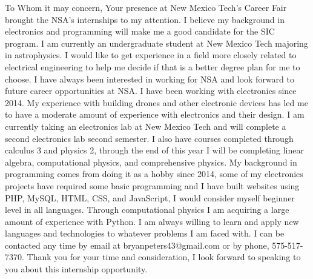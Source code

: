 \begin{flushleft}
\hspace{0pt}
\vfill
    
    To Whom it may concern, 
\break
\newline
    Your presence at New Mexico Tech's Career Fair brought the NSA's internships to my attention. I believe my background in electronics and programming will make me a good candidate for the SIC program. I am currently an undergraduate student at New Mexico Tech majoring in astrophysics. I would like to get experience in a field more closely related to electrical engineering to help me decide if that is a better degree plan for me to choose. I have always been interested in working for NSA and look forward to future career opportunities at NSA. 
\break
\newline
    I have been working with electronics since 2014. My experience with building drones and other electronic devices has led me to have a moderate amount of experience with electronics and their design. I am currently taking an electronics lab at New Mexico Tech and will complete a second electronics lab second semester. I also have courses completed through calculus 3 and physics 2, through the end of this year I will be completing linear algebra, computational physics, and comprehensive physics. My background in programming comes from doing it as a hobby since 2014, some of my electronics projects have required some basic programming and I have built websites using PHP, MySQL, HTML, CSS, and JavaScript, I would consider myself beginner level in all languages. Through computational physics I am acquiring a large amount of experience with Python. I am always willing to learn and apply new languages and technologies to whatever problems I am faced with.
\break
\newline
    I can be contacted any time by email at bryanpeters43@gmail.com or by phone, 575-517-7370. 
\break
\newline
    Thank you for your time and consideration, I look forward to speaking to you about this internship opportunity.

\vfill
\hspace{0pt}
\end{flushleft}